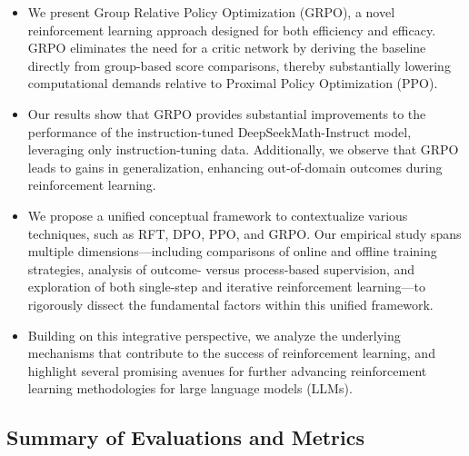 \begin{itemize}[topsep=0pt]
    \item We present Group Relative Policy Optimization (GRPO), a novel reinforcement learning approach designed for both efficiency and efficacy. GRPO eliminates the need for a critic network by deriving the baseline directly from group-based score comparisons, thereby substantially lowering computational demands relative to Proximal Policy Optimization (PPO).
    \item Our results show that GRPO provides substantial improvements to the performance of the instruction-tuned DeepSeekMath-Instruct model, leveraging only instruction-tuning data. Additionally, we observe that GRPO leads to gains in generalization, enhancing out-of-domain outcomes during reinforcement learning.
    \item We propose a unified conceptual framework to contextualize various techniques, such as RFT, DPO, PPO, and GRPO. Our empirical study spans multiple dimensions—including comparisons of online and offline training strategies, analysis of outcome- versus process-based supervision, and exploration of both single-step and iterative reinforcement learning—to rigorously dissect the fundamental factors within this unified framework.
    \item Building on this integrative perspective, we analyze the underlying mechanisms that contribute to the success of reinforcement learning, and highlight several promising avenues for further advancing reinforcement learning methodologies for large language models (LLMs).
\end{itemize}

\subsection{Summary of Evaluations and Metrics}

